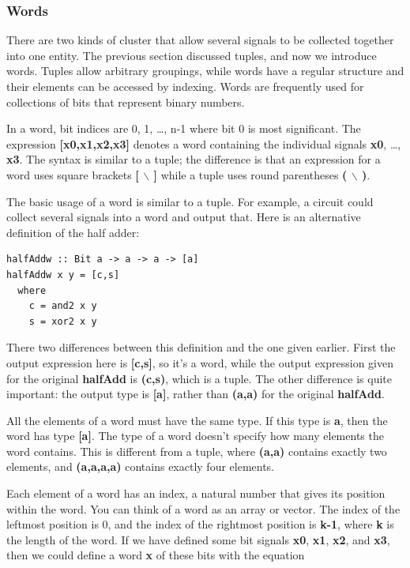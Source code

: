 \documentclass[]{svmono}
\begin{document}
\subsubsection*{Words}
\label{sec:orgaba0ee8}

There are two kinds of cluster that allow several signals to be
collected together into one entity.  The previous section discussed
tuples, and now we introduce words.  Tuples allow arbitrary groupings,
while words have a regular structure and their elements can be
accessed by indexing.  Words are frequently used for collections of
bits that represent binary numbers.


In a word, bit indices are 0, 1, \ldots{}, n-1 where bit 0 is most
significant.  The expression \textbf{{[}x0,x1,x2,x3]} denotes a word containing
the individual signals \textbf{x0}, \ldots{}, \textbf{x3}.  The syntax is similar to a
tuple; the difference is that an expression for a word uses square
brackets \textbf{{[} $\backslash$ ]} while a tuple uses round parentheses \textbf{( $\backslash$ )}.

The basic usage of a word is similar to a tuple.  For example, a
circuit could collect several signals into a word and output that.
Here is an alternative definition of the half adder:


\begin{verbatim}
halfAddw :: Bit a -> a -> a -> [a]
halfAddw x y = [c,s]
  where
    c = and2 x y
    s = xor2 x y
\end{verbatim}


There two differences between this definition and the one given
earlier.  First the output expression here is \textbf{{[}c,s]}, so it's a word,
while the output expression given for the original \textbf{halfAdd} is
\textbf{(c,s)}, which is a tuple.  The other difference is quite important:
the output type is \textbf{{[}a]}, rather than \textbf{(a,a)} for the original
\textbf{halfAdd}.

All the elements of a word must have the same type.  If this type is
\textbf{a}, then the word has type \textbf{{[}a]}.  The type of a word doesn't specify
how many elements the word contains.  This is different from a tuple,
where \textbf{(a,a)} contains exactly two elements, and \textbf{(a,a,a,a)} contains
exactly four elements.

Each element of a word has an index, a natural number that gives its
position within the word.  You can think of a word as an array or
vector.  The index of the leftmost position is 0, and the index of the
rightmost position is \textbf{k-1}, where \textbf{k} is the length of the word.
If we have defined some bit signals \textbf{x0}, \textbf{x1}, \textbf{x2}, and \textbf{x3}, then
we could define a word \textbf{x} of these bits with the equation
\end{document}
